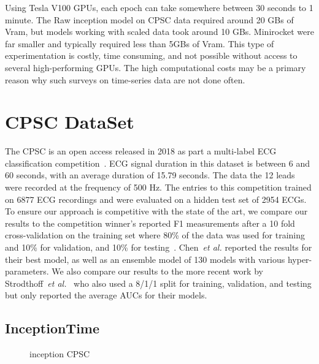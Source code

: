 \documentclass{article}
\begin{document}
Using Tesla V100 GPUs, each epoch can take somewhere between 30 seconds to 1 minute. The Raw inception model on CPSC data required around 20 GBs of Vram, but models working with scaled data took around 10 GBs. Minirocket were far smaller and typically required less than 5GBs of Vram. This type of experimentation is costly, time consuming, and not possible without access to several high-performing GPUs. The high computational costs may be a primary reason why such surveys on time-series data are not done often.

\section{CPSC DataSet}
The CPSC is an open access  released in 2018 as part a multi-label ECG classification competition~\cite{liu2018open}. ECG signal duration in this dataset is between 6 and 60 seconds, with an average duration of 15.79 seconds. The data the 12 leads were recorded at the frequency of 500 Hz. The entries to this competition trained on 6877 ECG recordings and were evaluated on a hidden test set of 2954 ECGs. To ensure our approach is competitive with the state of the art, we compare our results to the competition winner's reported F1 measurements after a 10 fold cross-validation on the training set where 80\% of the data was used for training and 10\% for validation, and 10\% for testing~\cite{chen2020detection}. Chen~\textit{et al.} reported the results for their best model, as well as an ensemble model of 130 models with various hyper-parameters.
We also compare our results to the more recent work by Strodthoff~\textit{et al.}~\cite{Strodthoff2021} who also used a 8/1/1 split for training, validation, and testing but only reported the average AUCs for their models. 

\subsection{InceptionTime}

\begin{figure}[!htbp]
  \caption{inception CPSC}\label{fig:inception_cpsc}
\end{figure}
\end{document}
